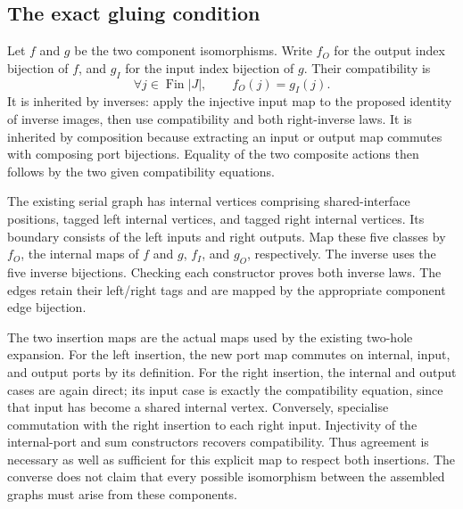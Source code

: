 
\subsection{The exact gluing condition}
Let $f$ and $g$ be the two component isomorphisms. Write $f_O$ for the output
index bijection of $f$, and $g_I$ for the input index bijection of $g$.
Their compatibility is
\[
                 \forall j\in\operatorname{Fin}|J|,\qquad f_O(j)=g_I(j).
\]
It is inherited by inverses: apply the injective input map to the proposed
identity of inverse images, then use compatibility and both right-inverse laws.
It is inherited by composition because extracting an input or output map
commutes with composing port bijections. Equality of the two composite actions
then follows by the two given compatibility equations.


The existing serial graph has internal vertices comprising shared-interface
positions, tagged left internal vertices, and tagged right internal vertices.
Its boundary consists of the left inputs and right outputs. Map these five
classes by $f_O$, the internal maps of $f$ and $g$, $f_I$, and $g_O$, respectively.
The inverse uses the five inverse bijections. Checking each constructor proves
both inverse laws. The edges retain their left/right tags and are mapped by the
appropriate component edge bijection.


The two insertion maps are the actual maps used by the existing two-hole
expansion. For the left insertion, the new port map commutes on internal,
input, and output ports by its definition. For the right insertion, the
internal and output cases are again direct; its input case is exactly the
compatibility equation, since that input has become a shared internal vertex.
Conversely, specialise commutation with the right insertion to each right input.
Injectivity of the internal-port and sum constructors recovers compatibility.
Thus agreement is necessary as well as sufficient for this explicit map to
respect both insertions. The converse does not claim that every possible
isomorphism between the assembled graphs must arise from these components.

